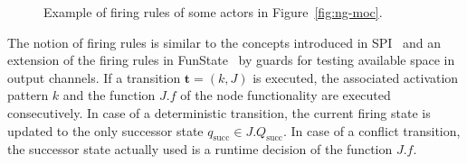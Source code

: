 
\begin{figure}[t]
\centering
{}
\caption{\label{fig:firing-rules}Example of firing rules of some actors in Figure~\ref{fig:ng-moc}.}
\end{figure}

The notion of firing rules is similar to the concepts introduced in
SPI~\cite{ZERTT99a} and an extension of the firing rules in FunState~\cite{STZETG00}
by guards for testing available space in output channels.
If a transition $\mathbf{t} = (k,J)$ is executed, the associated
activation pattern $k$ and the function $J.f$ of the node functionality
are executed consecutively. In case of a deterministic transition, the current firing
state is updated to the only successor state $q_\mathrm{succ} \in J.Q_\mathrm{succ}$.
In case of a conflict transition, the successor state actually used is
a runtime decision of the function $J.f$.

